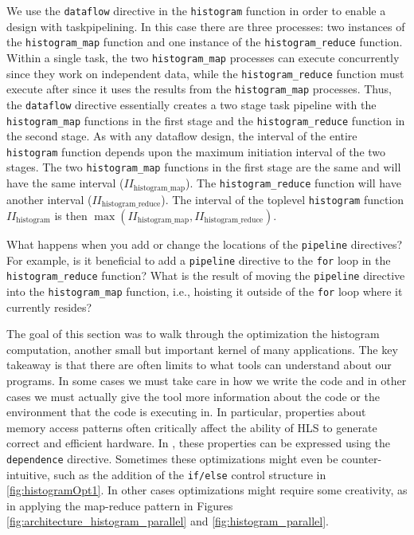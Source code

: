 We use the \lstinline{dataflow} directive in the \lstinline{histogram} function in order to enable a design with \gls{taskpipelining}.   In this case there are three processes: two instances of the \lstinline{histogram_map} function and one instance of the \lstinline{histogram_reduce} function. Within a single task, the two \lstinline{histogram_map} processes can execute concurrently since they work on independent data, while the \lstinline{histogram_reduce} function must execute after since it uses the results from the  \lstinline{histogram_map} processes. Thus, the \lstinline{dataflow} directive essentially creates a two stage task pipeline with the \lstinline{histogram_map} functions in the first stage and the \lstinline{histogram_reduce} function in the second stage.   As with any dataflow design, the interval of the entire \lstinline{histogram} function depends upon the maximum initiation interval of the two stages. The two \lstinline{histogram_map} functions in the first stage are the same and will have the same interval ($II_\mathrm{histogram\_map}$). The \lstinline{histogram_reduce} function will have another interval ($II_\mathrm{histogram\_reduce}$). The interval of the toplevel \lstinline{histogram} function $II_\mathrm{histogram}$ is then $\max (II_\mathrm{histogram\_map}, II_\mathrm{histogram\_reduce})$.

\begin{exercise}
What happens when you add or change the locations of the \lstinline{pipeline} directives? For example, is it beneficial to add a \lstinline{pipeline} directive to the \lstinline{for} loop in the \lstinline{histogram_reduce} function? What is the result of moving the \lstinline{pipeline} directive into the \lstinline{histogram_map} function, i.e., hoisting it outside of the \lstinline{for} loop where it currently resides? 
\end{exercise}

The goal of this section was to walk through the optimization the histogram computation, another small but important kernel of many applications. The key takeaway is that there are often limits to what tools can understand about our programs.  In some cases we must take care in how we write the code and in other cases we must actually give the tool more information about the code or the environment that the code is executing in.  In particular, properties about memory access patterns often critically affect the ability of HLS to generate correct and efficient hardware.  In \VHLS, these properties can be expressed using the \lstinline|dependence| directive.  Sometimes these optimizations might even be counter-intuitive, such as the addition of the \lstinline{if/else} control structure in \ref{fig:histogramOpt1}.  In other cases optimizations might require some creativity, as in applying the map-reduce pattern in Figures \ref{fig:architecture_histogram_parallel} and \ref{fig:histogram_parallel}.  

